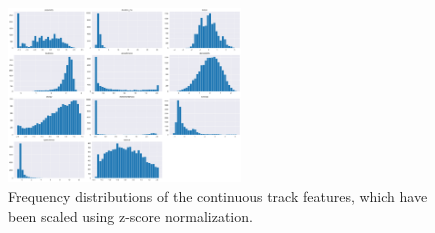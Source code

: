 \documentclass[times, twocolumn]{article}
\begin{document}
\begin{figure}[H]
    \centering
    \includegraphics[width=0.55\textwidth]{feature_dists.png}
    \caption{Frequency distributions of the continuous track features, which have been scaled using z-score normalization.}
    \label{graph:dists}
\end{figure}
\end{document}
